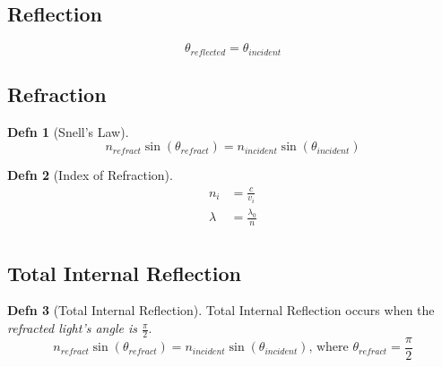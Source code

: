 \documentclass[10pt,letterpaper,final,twoside,notitlepage]{article}
\numberwithin{equation}{section} %
\theoremstyle{definition}
\newtheorem{definition}{Defn} %
\theoremstyle{remark}
\begin{document}
	\subsection*{Reflection} \label{subsec:Reflection}
		\begin{equation} \label{eq:Reflected Light}
			\theta_{reflected} = \theta_{incident}
		\end{equation}
		
	\subsection*{Refraction} \label{subsec:Refraction}
		\begin{definition}[Snell's Law] \label{def:Snell's Law}
			\begin{equation} \label{eq:Refracted Light} 
				n_{refract} \sin \left( \theta_{refract} \right) = n_{incident} \sin \left( \theta_{incident} \right)
			\end{equation}
		\end{definition}
		\begin{definition}[Index of Refraction] \label{def:Index of Refraction}
			\begin{equation} \label{eq:Index of Refraction}
				\begin{aligned}
					n_{i} &= \frac{c}{v_{i}} \\
					\lambda &= \frac{\lambda_{0}}{n} \\
				\end{aligned}
			\end{equation}
		\end{definition}
	
	\subsection*{Total Internal Reflection} \label{subsec:Total Internal Reflection}
		\begin{definition}[Total Internal Reflection] \label{def:Total Internal Reflection}
			Total Internal Reflection occurs when the \emph{refracted light's angle is $\frac{\pi}{2}$}.
			\begin{equation} \label{eq:Total Internal Reflection}
				n_{refract} \sin \left( \theta_{refract} \right) = n_{incident} \sin \left( \theta_{incident} \right) \text{, where } \theta_{refract} = \frac{\pi}{2}
			\end{equation}
		\end{definition}
		
\end{document}
